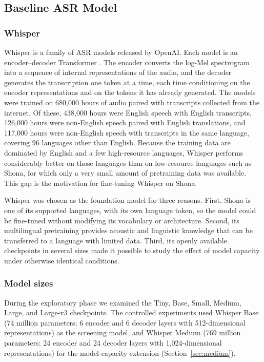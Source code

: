 \subsection{Baseline ASR Model}
\label{sec:baseline}

\subsubsection{Whisper}

Whisper \citep{Radford2022} is a family of ASR models released by OpenAI. Each
model is an encoder--decoder Transformer \citep{Vaswani2017}. The encoder converts
the log-Mel spectrogram into a sequence of internal representations of the audio,
and the decoder generates the transcription one token at a time, each time
conditioning on the encoder representations and on the tokens it has already
generated. The models were trained on 680,000 hours of audio paired with
transcripts collected from the internet. Of these, 438,000 hours were English
speech with English transcripts, 126,000 hours were non-English speech paired with
English translations, and 117,000 hours were non-English speech with transcripts
in the same language, covering 96 languages other than English. Because the
training data are dominated by English and a few high-resource languages, Whisper
performs considerably better on those languages than on low-resource languages
such as Shona, for which only a very small amount of pretraining data was
available. This gap is the motivation for fine-tuning Whisper on Shona.

Whisper was chosen as the foundation model for three reasons. First, Shona is one
of its supported languages, with its own language token, so the model could be
fine-tuned without modifying its vocabulary or architecture. Second, its
multilingual pretraining provides acoustic and linguistic knowledge that can be
transferred to a language with limited data. Third, its openly available
checkpoints in several sizes made it possible to study the effect of model
capacity under otherwise identical conditions.

\subsubsection{Model sizes}

During the exploratory phase we examined the Tiny, Base, Small, Medium, Large,
and Large-v3 checkpoints. The controlled experiments used Whisper Base
(74 million parameters; 6 encoder and 6 decoder layers with 512-dimensional
representations) as the screening model, and Whisper Medium (769 million
parameters; 24 encoder and 24 decoder layers with 1,024-dimensional
representations) for the model-capacity extension (Section~\ref{sec:medium}).

